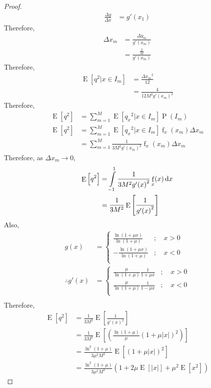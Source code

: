 \documentclass[titlepage, fleqn, a4paper, 12pt, twoside]{article}
\theoremstyle{definition}
\theoremstyle{theorem}
\DeclareMathOperator{\pdf}{\mathrm{f}}
\DeclareMathOperator{\prob}{\mathrm{P}}
\DeclareMathOperator{\expct}{\mathrm{E}}
\begin{document}
\begin{proof}
	\begin{align*}
		\frac{\Delta y}{\Delta x} &= g'(x_1)
	\end{align*}
	Therefore,
	\begin{align*}
		\Delta x_m &= \frac{\Delta y_m}{g'(x_m)}\\
		&= \frac{\frac{2}{M}}{g'(x_m)}
	\end{align*}
	Therefore,
	\begin{align*}
		\expct\left[ q^2 \Big| x \in I_m \right] &= \frac{{\Delta x_m}^2}{12}\\
		&= \frac{4}{12 M^2 {g'(x_m)}^2}
	\end{align*}
	Therefore,
	\begin{align*}
		\expct\left[ q^2 \right] &= \sum\limits_{m = 1}^{M} \expct\left[ {q_x}^2 \Big| x \in I_m \right] \prob(I_m)\\
		\expct\left[ q^2 \right] &= \sum\limits_{m = 1}^{M} \expct\left[ {q_x}^2 \Big| x \in I_m \right] \pdf_x(x_m) \Delta x_m\\
		&= \sum\limits_{m = 1}^{M} \frac{1}{3 M^2 {g'(x_m)}^2} \pdf_x(x_m) \Delta x_m
	\end{align*}
	Therefore, as $\Delta x_m \to 0$,
	\begin{align*}
		\expct\left[ q^2 \right] &= \int\limits_{-1}^{1} \frac{1}{3 M^2 {g'(x)}^2} \pdf_x(x) \dif x\\
		&= \frac{1}{3 M^2} \expct\left[ \frac{1}{{g'(x)}^2} \right]\\
	\end{align*}
	Also,
	\begin{align*}
		g(x) &=
			\begin{cases}
				\frac{\ln(1 + \mu x)}{\ln(1 + \mu)} &;\quad x > 0\\
				-\frac{\ln(1 + \mu x)}{\ln(1 + \mu)} &;\quad x < 0\\
			\end{cases}\\
		\therefore g'(x) &=
			\begin{cases}
				\frac{\mu}{\ln(1 + \mu)} \frac{1}{1 + \mu x} &;\quad x > 0\\
				\frac{\mu}{\ln(1 + \mu)} \frac{1}{1 - \mu x} &;\quad x < 0\\
			\end{cases}\\
	\end{align*}
	Therefore,
	\begin{align*}
		\expct\left[ q^2 \right] &= \frac{1}{3 M^2} \expct\left[ \frac{1}{{g'(x)}^2} \right]\\
		&= \frac{1}{3 M^2} \expct\left[ \left( \frac{\ln(1 + \mu)}{\mu} \left( 1 + \mu |x| \right)^2 \right) \right]\\
		&= \frac{\ln^2(1 + \mu)}{3 \mu^2 M^2} \expct\left[ \left( 1 + \mu |x| \right)^2 \right]\\
		&= \frac{\ln^2(1 + \mu)}{3 \mu^2 M^2} \left( 1 + 2 \mu \expct\left[ |x| \right] + \mu^2 \expct\left[ x^2 \right] \right)
	\end{align*}
\end{proof}
\end{document}
